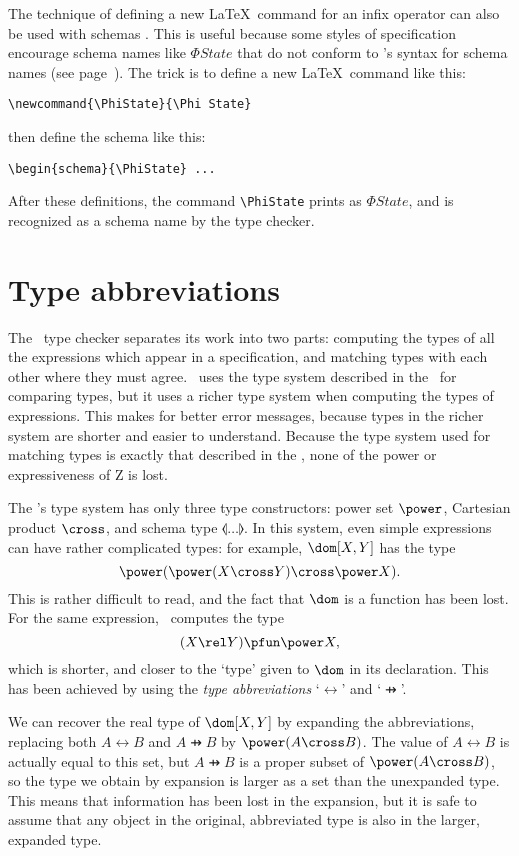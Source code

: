 {{The technique of defining a new \LaTeX\ command for an infix
operator can also be used with schemas%
.  This is useful
because some
styles of specification encourage schema names like $\Phi State$
that do not conform to \fuzz's syntax for schema names (see
page~\pageref{lexis}).  The trick
is to define a new \LaTeX\ command like this:
\begin{verbatim}
\newcommand{\PhiState}{\Phi State}
\end{verbatim}
then define the schema like this:
\begin{verbatim}
\begin{schema}{\PhiState} ...
\end{verbatim}
After these definitions, the command \verb/\PhiState/ prints as
$\Phi State$, and is recognized as a schema name by the type checker.

\newpage
\section{Type abbreviations}\label{abbrev}

The \fuzz\ type checker separates its
work into two parts: computing the types of all the expressions
which appear in a specification, and matching types with each other
where they must agree. \Fuzz\ uses the type system described in the
\ZRM\ for comparing types, but it uses a richer type system when
computing the types of expressions. This makes for better error
messages, because types in the richer system are shorter and easier
to understand.  Because the type system used for matching types is
exactly that described in the \ZRM, none of the power or
expressiveness of Z is lost.

The \ZRM's type system has only three type constructors: power set
$\power$, Cartesian product $\cross$, and schema type
$\lblot\ldots\rblot$. In this system, even simple expressions can
have rather complicated types: for example, $\dom[X,Y]$ has the type
\[
        \power(\power(X \cross Y) \cross \power X).
\]
This is rather difficult to read, and the fact that $\dom$ is a
function has been lost.  For the same expression, \fuzz\ computes the
type
\[
        (X \rel Y) \pfun \power X,
\]
which is shorter, and closer to the `type' given to $\dom$ in its
declaration. This has been achieved by using the {\em type
abbreviations\/} `$\rel$' and `$\pfun$'. 

We can recover the real type of $\dom[X,Y]$ by expanding the
abbreviations, replacing both
$A \rel B$ and $A \pfun B$ by $\power(A \cross B)$. The value of $A
\rel B$ is actually equal to this set, but $A \pfun B$ is a proper
subset of $\power(A \cross B)$, so the type we obtain by expansion
is larger as a set than the unexpanded type. This means that
information has been lost in the expansion, but it is safe to assume
that any object in the original, abbreviated type is also in the
larger, expanded type.

}}
